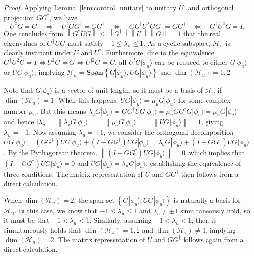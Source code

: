 \documentclass[letterpaper,onecolumn,11pt,accepted=2026-02-14]{quantumarticle}
\newcommand{\abs}[1]{\left\lvert#1\right\rvert}
\newcommand{\norm}[1]{\left\lVert#1\right\rVert}
\theoremstyle{remark}
\theoremstyle{plain}
\newcommand{\lem}[1]{\hyperref[lem:#1]{Lemma~\ref*{lem:#1}}}
\newcommand{\ket}[1]{|#1\rangle}
\begin{document}
\begin{proof}
Applying \lem{control_unitary} to unitary $U^2$ and orthogonal projection $GG^\dagger$, we have
\begin{equation}
    U^2G=G
    \quad\Leftrightarrow\quad
    U^2GG^\dagger=GG^\dagger
    \quad\Leftrightarrow\quad
    GG^\dagger U^2 GG^\dagger=GG^\dagger
    \quad\Leftrightarrow\quad
    G^\dagger U^2G=I.
\end{equation}
One concludes from $\norm{G^\dagger UG}\leq\norm{G^\dagger}\norm{U}\norm{G}=1$ that the real eigenvalues of $G^\dagger UG$ must satisfy $-1\leq\lambda_u\leq 1$. As a cyclic subspace, $\mathcal{H}_u$ is clearly invariant under $U$ and $U^\dagger$. Furthermore, due to the equivalence $G^\dagger U^2G=I\Leftrightarrow U^2G=G\Leftrightarrow U^{\dagger2}G=G$, all $U^lG\ket{\phi_u}$ can be reduced to either $G\ket{\phi_u}$ or $UG\ket{\phi_u}$, implying $\mathcal{H}_u=\mathbf{Span}\left\{G\ket{\phi_u},UG\ket{\phi_u}\right\}$ and $\dim(\mathcal{H}_u)=1,2$.

Note that $G\ket{\phi_u}$ is a vector of unit length, so it must be a basis of $\mathcal{H}_u$ if $\dim(\mathcal{H}_u)=1$. When this happens, $UG\ket{\phi_u}=\mu_uG\ket{\phi_u}$ for some complex number $\mu_u$. But this means $\lambda_uG\ket{\phi_u}=GG^\dagger UG\ket{\phi_u}=\mu_uGG^\dagger G\ket{\phi_u}=\mu_uG\ket{\phi_u}$ and hence $\abs{\lambda_u}=\norm{\lambda_uG\ket{\phi_u}}=\norm{\mu_uG\ket{\phi_u}}=\norm{UG\ket{\phi_u}}=1$, giving $\lambda_u=\pm 1$. Now assuming $\lambda_u=\pm 1$, we consider the orthogonal decomposition $UG\ket{\phi_u}=\left(GG^\dagger\right) UG\ket{\phi_u}+\left(I-GG^\dagger\right)UG\ket{\phi_u}=\lambda_uG\ket{\phi_u}+\left(I-GG^\dagger\right)UG\ket{\phi_u}$. By the  Pythagorean theorem, $\norm{\left(I-GG^\dagger\right)UG\ket{\phi_u}}=0$, which implies that $\left(I-GG^\dagger\right)UG\ket{\phi_u}=0$ and $UG\ket{\phi_u}=\lambda_uG\ket{\phi_u}$, establishing the equivalence of three conditions. The matrix representation of $U$ and $GG^\dagger$ then follows from a direct calculation.

When $\dim(\mathcal{H}_u)=2$, the span set $\left\{G\ket{\phi_u},UG\ket{\phi_u}\right\}$ is naturally a basis for $\mathcal{H}_u$. In this case, we know that $-1\leq\lambda_u\leq 1$ and $\lambda_u\neq\pm1$ simultaneously hold, so it must be that $-1<\lambda_u<1$. Similarly, assuming $-1<\lambda_u<1$, then it simultaneously holds that $\dim(\mathcal{H}_u)=1,2$ and $\dim(\mathcal{H}_u)\neq1$, implying $\dim(\mathcal{H}_u)=2$. The matrix representation of $U$ and $GG^\dagger$ follows again from a direct calculation.
\end{proof}
\end{document}
